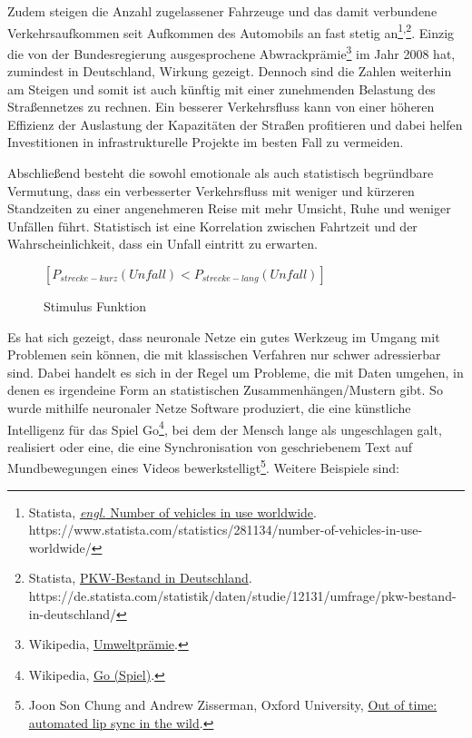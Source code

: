 Zudem steigen die Anzahl zugelassener Fahrzeuge und das damit verbundene Verkehrsaufkommen seit Aufkommen des Automobils an fast stetig an\footnote{Statista, \href{https://www.statista.com/statistics/281134/number-of-vehicles-in-use-worldwide/}{\textit{engl.} Number of vehicles in use worldwide}. \\https://www.statista.com/statistics/281134/number-of-vehicles-in-use-worldwide/}\textsuperscript{,}\footnote{Statista, \href{https://de.statista.com/statistik/daten/studie/12131/umfrage/pkw-bestand-in-deutschland/}{PKW-Bestand in Deutschland}. \\https://de.statista.com/statistik/daten/studie/12131/umfrage/pkw-bestand-in-deutschland/}. Einzig die von der Bundesregierung ausgesprochene Abwrackprämie\footnote{Wikipedia, \href{https://de.wikipedia.org/wiki/Umweltpr\%C3\%A4mie}{Umweltprämie}.} im Jahr 2008 hat, zumindest in Deutschland, Wirkung gezeigt. Dennoch sind die Zahlen weiterhin am Steigen und somit ist auch künftig mit einer zunehmenden Belastung des Straßennetzes zu rechnen. Ein besserer Verkehrsfluss kann von einer höheren Effizienz der Auslastung der Kapazitäten der Straßen profitieren und dabei helfen Investitionen in infrastrukturelle Projekte im besten Fall zu vermeiden.

Abschließend besteht die sowohl emotionale als auch statistisch begründbare Vermutung, dass ein verbesserter Verkehrsfluss mit weniger und kürzeren Standzeiten zu einer angenehmeren Reise mit mehr Umsicht, Ruhe und weniger Unfällen führt. Statistisch ist eine Korrelation zwischen Fahrtzeit und der Wahrscheinlichkeit, dass ein Unfall eintritt zu erwarten.

\begin{figure}[H]
    \centering
	\( [ P_{strecke-kurz}(Unfall) < P_{strecke-lang}(Unfall) ] \)
    \caption{Stimulus Funktion}
    \label{intro:stimulus_function}
\end{figure}


Es hat sich gezeigt, dass neuronale Netze ein gutes Werkzeug im Umgang mit Problemen sein können, die mit klassischen Verfahren nur schwer adressierbar sind. Dabei handelt es sich in der Regel um Probleme, die mit Daten umgehen, in denen es irgendeine Form an statistischen Zusammenhängen/Mustern gibt. So wurde mithilfe neuronaler Netze Software produziert, die eine künstliche Intelligenz für das Spiel Go\footnote{Wikipedia, \href{https://de.wikipedia.org/wiki/Go\_(Spiel)}{Go (Spiel)}.}, bei dem der Mensch lange als ungeschlagen galt, realisiert oder eine, die eine Synchronisation von geschriebenem Text auf Mundbewegungen eines Videos bewerkstelligt\footnote{Joon Son Chung and Andrew Zisserman, Oxford University, \href{https://www.robots.ox.ac.uk/~vgg/publications/2016/Chung16a/chung16a.pdf}{Out of time: automated lip sync in the wild}.}. Weitere Beispiele sind:

